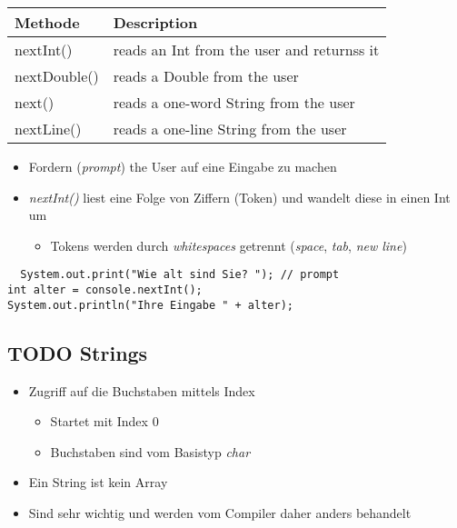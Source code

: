 \documentclass[11pt]{article}
\begin{document}
\begin{center}
\begin{tabular}{ll}
Methode & Description\\
\hline
nextInt() & reads an Int from the user and returnss it\\
nextDouble() & reads a Double from the user\\
next() & reads a one-word String from the user\\
nextLine() & reads a one-line String from the user\\
\end{tabular}
\end{center}

\begin{itemize}
\item Fordern (\emph{prompt}) the User auf eine Eingabe zu machen\\
\item \emph{nextInt()} liest eine Folge von Ziffern (Token) und wandelt diese in einen Int um\\
\begin{itemize}
\item Tokens werden durch \emph{whitespaces} getrennt (\emph{space}, \emph{tab}, \emph{new line})\\
\end{itemize}
\end{itemize}


\begin{verbatim}
  System.out.print("Wie alt sind Sie? "); // prompt
int alter = console.nextInt();
System.out.println("Ihre Eingabe " + alter);
\end{verbatim}


\subsection{{\bfseries\sffamily TODO} Strings}
\label{sec:org166cb94}
\begin{itemize}
\item Zugriff auf die Buchstaben mittels Index\\
\begin{itemize}
\item Startet mit Index 0\\
\item Buchstaben sind vom Basistyp \emph{char}\\
\end{itemize}
\item Ein String ist kein Array\\
\item Sind sehr wichtig und werden vom Compiler daher anders behandelt\\
\end{itemize}
\end{document}
